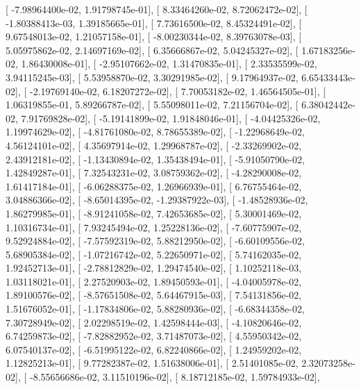 \documentclass{article}
\begin{document}
       [ -7.98964400e-02,   1.91798745e-01],
       [  8.33464260e-02,   8.72062472e-02],
       [ -1.80388413e-03,   1.39185665e-01],
       [  7.73616500e-02,   8.45324491e-02],
       [  9.67548013e-02,   1.21057158e-01],
       [ -8.00230344e-02,   8.39763078e-03],
       [  5.05975862e-02,   2.14697169e-02],
       [  6.35666867e-02,   5.04245327e-02],
       [  1.67183256e-02,   1.86430008e-01],
       [ -2.95107662e-02,   1.31470835e-01],
       [  2.33535599e-02,   3.94115245e-03],
       [  5.53958870e-02,   3.30291985e-02],
       [  9.17964937e-02,   6.65433443e-02],
       [ -2.19769140e-02,   6.18207272e-02],
       [  7.70053182e-02,   1.46564505e-01],
       [  1.06319855e-01,   5.89266787e-02],
       [  5.55098011e-02,   7.21156704e-02],
       [  6.38042442e-02,   7.91769828e-02],
       [ -5.19141899e-02,   1.91848046e-01],
       [ -4.04425326e-02,   1.19974629e-02],
       [ -4.81761080e-02,   8.78655389e-02],
       [ -1.22968649e-02,   4.56124101e-02],
       [  4.35697914e-02,   1.29968787e-02],
       [ -2.33269902e-02,   2.43912181e-02],
       [ -1.13430894e-02,   1.35438494e-01],
       [ -5.91050790e-02,   1.42849287e-01],
       [  7.32543231e-02,   3.08759362e-02],
       [ -4.28290008e-02,   1.61417184e-01],
       [ -6.06288375e-02,   1.26966939e-01],
       [  6.76755464e-02,   3.04886366e-02],
       [ -8.65014395e-02,  -1.29387922e-03],
       [ -1.48528936e-02,   1.86279985e-01],
       [ -8.91241058e-02,   7.42653685e-02],
       [  5.30001469e-02,   1.10316734e-01],
       [  7.93245494e-02,   1.25228136e-02],
       [ -7.60775907e-02,   9.52924884e-02],
       [ -7.57592319e-02,   5.88212950e-02],
       [ -6.60109556e-02,   5.68905384e-02],
       [ -1.07216742e-02,   5.22650971e-02],
       [  5.74162035e-02,   1.92452713e-01],
       [ -2.78812829e-02,   1.29474540e-02],
       [  1.10252118e-03,   1.03118021e-01],
       [  2.27520903e-02,   1.89450593e-01],
       [ -4.04005978e-02,   1.89100576e-02],
       [ -8.57651508e-02,   5.64467915e-03],
       [  7.54131856e-02,   1.51676052e-01],
       [ -1.17834806e-02,   5.88280936e-02],
       [ -6.68344358e-02,   7.30728949e-02],
       [  2.02298519e-02,   1.42598444e-03],
       [ -4.10820646e-02,   6.74259873e-02],
       [ -7.82882952e-02,   3.71487073e-02],
       [  4.55950342e-02,   6.07540137e-02],
       [ -6.51995122e-02,   6.82240866e-02],
       [  1.24959202e-02,   1.12825213e-01],
       [  9.77282387e-02,   1.51638006e-01],
       [  2.51401085e-02,   2.32073258e-02],
       [ -8.55656686e-02,   3.11510196e-02],
       [  8.18712185e-02,   1.59784933e-02],
\end{document}
